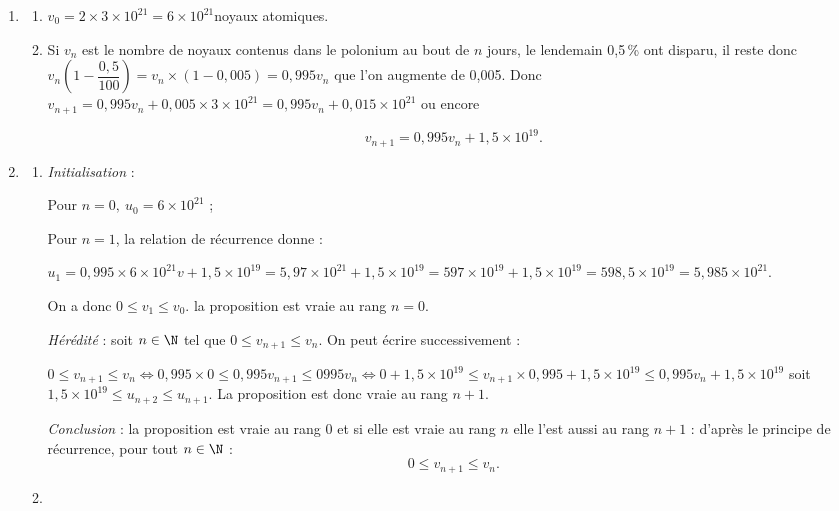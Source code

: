 \begin{enumerate}
\item 
	\begin{enumerate}
		\item %
$v_0 = 2 \times 3 \times 10^{21} = 6 \times 10^{21}$noyaux atomiques.
		\item %
Si $v_n$ est le nombre de noyaux contenus dans le polonium au bout de $n$ jours, le lendemain 0,5\,\% ont disparu, il reste donc $v_n \left( 1 -\dfrac{0,5}{100}\right)  = v_n \times (1 - 0,005) = 0,995v_n$ que l'on augmente de 0,005. Donc $v_{n+1} = 0,995v_n + 0,005 \times 3 \times 10^{21} = 0,995v_n + 0,015 \times 10^{21}$ ou encore 

\[v_{n+1} = 0,995v_n + 1,5 \times 10^{19}.\]
	\end{enumerate}
\item 
	\begin{enumerate}
		\item %
\emph{Initialisation} :

Pour $n = 0,\:u_0 = 6\times 10^{21}$ ;

Pour $n = 1$, la relation de récurrence donne :

$u_1 = 0,995\times 6\times 10^{21}v + 1,5 \times 10^{19} = 5,97 \times 10^{21} + 1,5 \times 10^{19} = 597 \times 10^{19} + 1,5 \times 10^{19} = 598,5 \times 10^{19} = 5,985 \times 10^{21}$.

On a donc $0\leqslant v_{1}  \leqslant v_0$. la proposition est vraie au rang $n = 0$.

\emph{Hérédité} : soit $n \in \N$ tel que $0 \leqslant v_{n+1}  \leqslant v_n$. On peut écrire successivement :	

$0 \leqslant v_{n+1} \leqslant v_n \iff 0,995\times 0 \leqslant 0,995v_{n+1} \leqslant 0995v_n \iff 0 + 1,5 \times 10^{19} \leqslant v_{n+1} \times 0,995 + 1,5 \times 10^{19} \leqslant 0,995v_n + 1,5 \times 10^{19}$ soit $1,5 \times 10^{19} \leqslant u_{n+2} \leqslant u_{n+1}$. La proposition est donc vraie au rang $n + 1$.

\emph{Conclusion }: la proposition est vraie au rang 0 et si elle est vraie au rang $n$ elle l'est aussi au rang $n + 1$ : d'après le principe de récurrence, pour tout $n \in \N$ :
\[0 \leqslant v_{n+1}  \leqslant v_n.\]

		\item %
		

\end{enumerate}
\end{enumerate}
